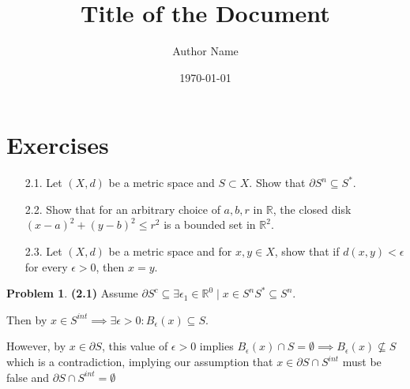 \documentclass{article}
\title{\textbf{Title of the Document}}
\author{Author Name}
\date{\today}
\theoremstyle{definition}
\newtheorem{problem}[theorem]{Problem}
\numberwithin{equation}{section}
\begin{document}
\maketitle
\tableofcontents
\newpage
\section{Exercises}
\begin{itemize}
    \item[2.1.] Let \((X,d)\) be a metric space and \(S \subset X\). Show that \( \partial S^n \subseteq S^*\).

    \item[2.2.] Show that for an arbitrary choice of \(a, b, r\) in \(\mathbb{R}\), the closed disk \((x-a)^2 + (y-b)^2 \leq r^2\) is a bounded set in \(\mathbb{R}^2\).

    \item[2.3.] Let \((X, d)\) be a metric space and for \(x, y \in X\), show that if \(d(x, y) < \epsilon\) for every \(\epsilon > 0\), then \(x = y\).

\end{itemize}

\begin{problem}
\textbf{(2.1)} Assume \( \partial S^c \subseteq \exists \epsilon_1 \in \mathbb{R}^0 \mid x \in S^n S^* \subseteq S^n \).

Then by \( x \in S^{int} \implies \exists \epsilon > 0 : B_{\epsilon}(x) \subseteq S \).

However, by \( x \in \partial S \), this value of \(\epsilon > 0\) implies $ B_{\epsilon}(x) \cap S = \emptyset \implies B_{\epsilon}(x) \nsubseteq S $
which is a contradiction, implying our assumption that \( x \in \partial S \cap S^{int} \) must be false and
$ \partial S \cap S^{int} = \emptyset $
\end{problem}
\end{document}

